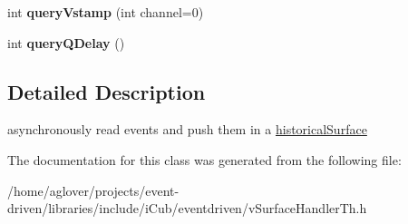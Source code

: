 \begin{DoxyCompactItemize}
\item 
int {\bfseries query\+Vstamp} (int channel=0)\hypertarget{classev_1_1hSurfThread_af5da61e8087f133f2202c873660779bc}{}\label{classev_1_1hSurfThread_af5da61e8087f133f2202c873660779bc}

\item 
int {\bfseries query\+Q\+Delay} ()\hypertarget{classev_1_1hSurfThread_a92089f336c6298e58440cee7f3b2eb07}{}\label{classev_1_1hSurfThread_a92089f336c6298e58440cee7f3b2eb07}

\end{DoxyCompactItemize}


\subsection{Detailed Description}
asynchronously read events and push them in a \hyperlink{classev_1_1historicalSurface}{historical\+Surface} 

The documentation for this class was generated from the following file\+:\begin{DoxyCompactItemize}
\item 
/home/aglover/projects/event-\/driven/libraries/include/i\+Cub/eventdriven/v\+Surface\+Handler\+Th.\+h\end{DoxyCompactItemize}
